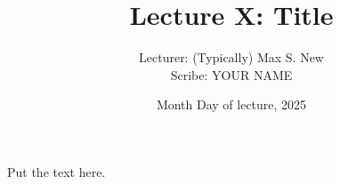 \documentclass[12pt]{article}
\begin{document}
\title{Lecture X: Title}
\author{Lecturer: (Typically) Max S. New\\ Scribe: YOUR NAME}
\date{Month Day of lecture, 2025}
\maketitle

Put the text here.
\end{document}
